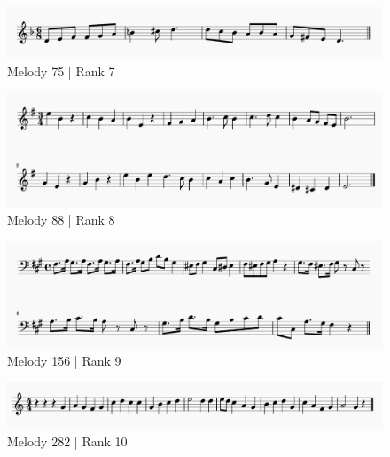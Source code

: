 \documentclass[12pt,]{book}
\begin{document}
\begin{figure}

{\centering \includegraphics[width=1\linewidth]{img/survey_melodies/Berkowitz75} 

}

\caption{Melody 75 | Rank 7}\label{fig:berk75}
\end{figure}

\begin{figure}

{\centering \includegraphics[width=1\linewidth]{img/survey_melodies/Berkowitz88} 

}

\caption{Melody 88 | Rank 8}\label{fig:berk88}
\end{figure}

\begin{figure}

{\centering \includegraphics[width=1\linewidth]{img/survey_melodies/Berkowitz156} 

}

\caption{Melody 156 | Rank 9}\label{fig:berk156}
\end{figure}

\begin{figure}

{\centering \includegraphics[width=1\linewidth]{img/survey_melodies/Berkowitz282} 

}

\caption{Melody 282 | Rank 10}\label{fig:berk282}
\end{figure}
\end{document}
